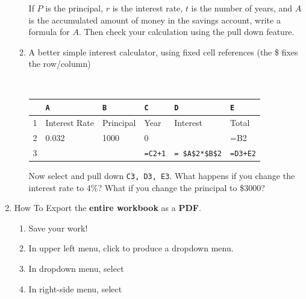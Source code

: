 \documentclass[12pt]{article}
\renewcommand{\emph}[1]{\textsf{\textbf{#1}}}
\begin{document}
\begin{enumerate}
\begin{enumerate}
	If $P$ is the principal, $r$ is the interest rate, $t$ is the number of years, and $A$ is the accumulated amount of money in the savings account, write a formula for $A$. Then check your calculation using the pull down feature. \\
	\vfill
	\item A better simple interest calculator, using fixed cell references (the \$ fixes the row/column)
	
		{\tt
	\hspace{-1cm}\begin{tabularx}{\textwidth}{|l||X|X|X|X|X|}
	\hline
	 & \verb'A' & \verb'B' & \verb'C' & \verb'D' & \verb'E'\\ \hline \hline
	1 & Interest Rate & Principal &  Year & Interest & Total \\ \hline
	2 & 0.032 & 1000 & 0 &  & =B2  \\ \hline
	3 & & & \verb`=C2+1` &\verb'= $A$2*$B$2' &  \verb'=D3+E2' \\ \hline 
	\end{tabularx}
	}
	Now select and pull down \verb'C3, D3, E3'. What happens if you change the interest rate to 4\%? What if you change the principal to \$3000?
	
	\vfill
	\end{enumerate}
\item How To Export the \emph{entire workbook} as a \emph{PDF}.
	\begin{enumerate}
	\item Save your work!
	\item In upper left menu, click  to produce a dropdown menu.
	\item In dropdown menu, select 
	\item In right-side menu, select 
	\end{enumerate}
	\vfill



\end{enumerate}
\end{document}
